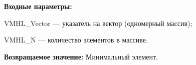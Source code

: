 \textbf{Входные параметры:}

 VMHL\_Vector --- указатель на вектор (одномерный массив);
 
 VMHL\_N --- количество элементов в массиве.

\textbf{Возвращаемое значение:}
Минимальный элемент.